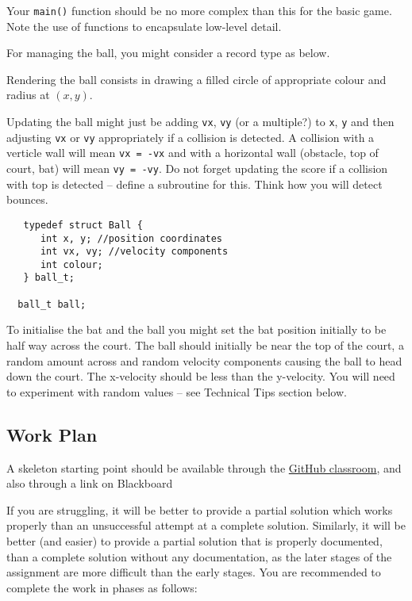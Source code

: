 \documentclass[a4paper]{article}
\begin{document}
{Your \texttt{main()} function should be no more complex than this for the
basic game.  Note the use of functions to encapsulate low-level
detail.

For managing the ball, you might consider a record type as below. 

Rendering the ball consists in drawing a filled circle of appropriate
colour and radius at $(x, y)$.

Updating the ball might just be adding \texttt{vx},
\texttt{vy} (or a multiple?) to \texttt{x},
\texttt{y} and then adjusting \texttt{vx} or \texttt{vy}
 appropriately if a
collision is detected. A collision with a verticle wall will mean
\texttt{vx = -vx} and with a horizontal wall (obstacle, top of court,
bat) will mean \texttt{vy = -vy}. Do not forget updating the score if
a collision with top is detected -- define a subroutine for
this. Think how you will detect bounces.

\begin{verbatim}
   typedef struct Ball {
      int x, y; //position coordinates
      int vx, vy; //velocity components
      int colour;
   } ball_t;

  ball_t ball;
\end{verbatim}

To initialise the bat and the ball you might set the bat position
initially to be half way across the court. The ball should initially
be near the top of the court, a random amount across and random
velocity components causing the ball to head down the court. The
x-velocity should be less than the y-velocity. You will need to
experiment with random values -- see Technical Tips section below.

\clearpage
\subsection{Work Plan}\label{stages}
A skeleton starting point should be available through the
\href{https://classroom.github.com/assignment-invitations/e0d3930cc5cf943bd1c10642b750ac8e}%
{GitHub classroom}, and also through a link on Blackboard

If you are struggling, it will be better to provide a partial solution
which works properly than an unsuccessful attempt at a complete
solution.  Similarly, it will be better (and easier) to provide a
partial solution that is properly documented, than a complete solution
without any documentation, as the later stages of the assignment are
more difficult than the early stages.  You are recommended to complete
the work in phases as follows:

}
\end{document}
